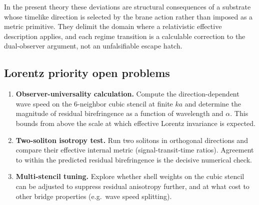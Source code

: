 In the present theory these deviations are structural consequences of a substrate whose timelike
direction is selected by the brane action rather than imposed as a metric primitive.
They delimit the domain where a relativistic effective description applies, and each regime
transition is a calculable correction to the dual-observer argument, not an unfalsifiable
escape hatch.

\subsection{Lorentz priority open problems}
\label{subsec:lorentz-open}

\begin{enumerate}
  \item \textbf{Observer-universality calculation.}
  Compute the direction-dependent wave speed on the 6-neighbor cubic stencil at finite $ka$
  and determine the magnitude of residual birefringence as a function of wavelength and $\alpha$.
  This bounds from above the scale at which effective Lorentz invariance is expected.

  \item \textbf{Two-soliton isotropy test.}
  Run two solitons in orthogonal directions and compare their effective internal metric
  (signal-transit-time ratios).
  Agreement to within the predicted residual birefringence is the decisive numerical check.

  \item \textbf{Multi-stencil tuning.}
  Explore whether shell weights on the cubic stencil can be adjusted to suppress residual
  anisotropy further, and at what cost to other bridge properties (e.g.\ wave speed splitting).
\end{enumerate}
